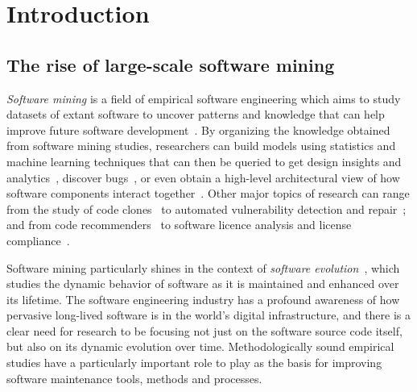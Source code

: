 \chapter{Introduction}%
\label{chp:introduction}


\section{The rise of large-scale software mining}

\emph{Software mining} is a field of empirical software engineering which aims
to study datasets of extant software to uncover patterns and knowledge that can
help improve future software development~\cite{2006-zeller-msr}. By organizing
the knowledge obtained from software mining studies, researchers can build
models using statistics and machine learning techniques that can then be
queried to get design insights and analytics~\cite{hassan2006mining}, discover
bugs~\cite{williams2005automatic,BugRepair2017}, or even obtain a high-level
architectural view of how software components interact
together~\cite{hassan2008road}.
Other major topics of research can range from the study of code
clones~\cite{SvajlenkoR17, SemuraYCI17, ThummalapentaCAP10,
rattan2013clonedetectionreview} to automated vulnerability detection and
repair~\cite{Li2017, Grieco2016, MartinezM15}; and from code
recommenders~\cite{Zeller2007, ZimmermannWDZ04} to software licence analysis
and license compliance~\cite{GermanLicense17, VendomeLicence2015}.

Software mining particularly shines in the context of \emph{software
evolution}~\cite{mens2008swevolintro,kagdi2007msrsurvey}, which studies the
dynamic behavior of software as it is maintained and enhanced over its
lifetime. The software engineering industry has a profound awareness of how
pervasive long-lived software is in the world's digital infrastructure, and
there is a clear need for research to be focusing not just on the software
source code itself, but also on its dynamic evolution over time.
Methodologically sound empirical studies have a particularly important role to
play as the basis for improving software maintenance tools, methods and
processes.

